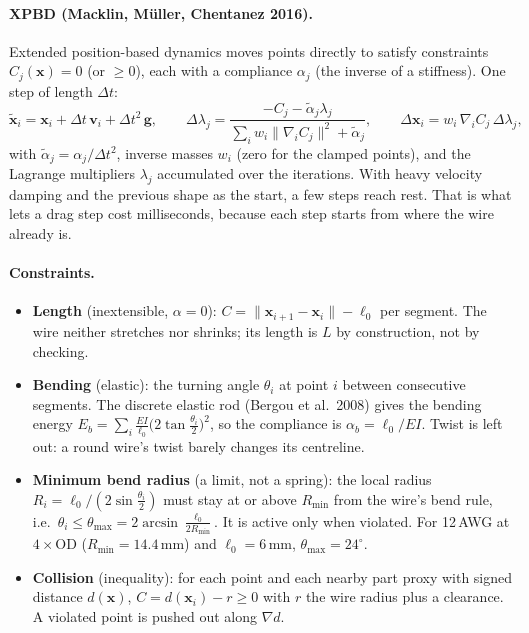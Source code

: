\paragraph{XPBD (Macklin, M\"uller, Chentanez 2016).} Extended position-based dynamics moves points directly to
satisfy constraints $C_j(\mathbf x)=0$ (or $\ge0$), each with a compliance $\alpha_j$ (the inverse of a
stiffness). One step of length $\Delta t$:
\[
  \tilde{\mathbf x}_i=\mathbf x_i+\Delta t\,\mathbf v_i+\Delta t^2\,\mathbf g,\qquad
  \Delta\lambda_j=\frac{-C_j-\tilde\alpha_j\lambda_j}{\sum_i w_i\lVert\nabla_iC_j\rVert^2+\tilde\alpha_j},\qquad
  \Delta\mathbf x_i=w_i\,\nabla_iC_j\,\Delta\lambda_j,
\]
with $\tilde\alpha_j=\alpha_j/\Delta t^2$, inverse masses $w_i$ (zero for the clamped points), and the
Lagrange multipliers $\lambda_j$ accumulated over the iterations. With heavy velocity damping and the previous
shape as the start, a few steps reach rest. That is what lets a drag step cost milliseconds, because each step
starts from where the wire already is.

\paragraph{Constraints.}
\begin{itemize}
  \item \textbf{Length} (inextensible, $\alpha=0$): $C=\lVert\mathbf x_{i+1}-\mathbf x_i\rVert-\ell_0$ per segment.
        The wire neither stretches nor shrinks; its length is $L$ by construction, not by checking.
  \item \textbf{Bending} (elastic): the turning angle $\theta_i$ at point $i$ between consecutive segments.
        The discrete elastic rod (Bergou et al.\ 2008) gives the bending energy
        $E_b=\sum_i \frac{EI}{\ell_0}\bigl(2\tan\frac{\theta_i}{2}\bigr)^2$, so the compliance is
        $\alpha_b=\ell_0/EI$. Twist is left out: a round wire's twist barely changes its centreline.
  \item \textbf{Minimum bend radius} (a limit, not a spring): the local radius $R_i=\ell_0/(2\sin\frac{\theta_i}{2})$
        must stay at or above $R_{\min}$ from the wire's bend rule, i.e.\ $\theta_i\le\theta_{\max}=2\arcsin
        \frac{\ell_0}{2R_{\min}}$. It is active only when violated. For 12\,AWG at $4\times$OD ($R_{\min}=14.4$\,mm)
        and $\ell_0=6$\,mm, $\theta_{\max}=24^\circ$.
  \item \textbf{Collision} (inequality): for each point and each nearby part proxy with signed distance $d(\mathbf x)$,
        $C=d(\mathbf x_i)-r\ge0$ with $r$ the wire radius plus a clearance. A violated point is pushed out along
        $\nabla d$.
\end{itemize}


